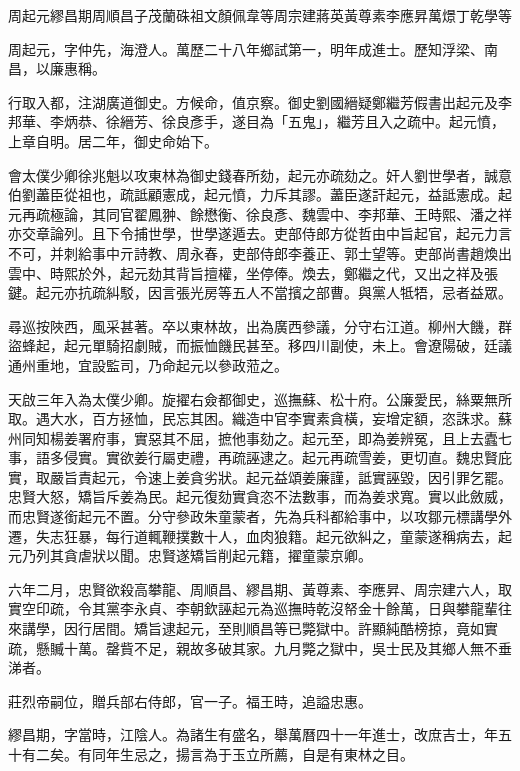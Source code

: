 
\begin{pinyinscope}
周起元繆昌期周順昌子茂蘭硃祖文顏佩韋等周宗建蔣英黃尊素李應昇萬燝丁乾學等

周起元，字仲先，海澄人。萬歷二十八年鄉試第一，明年成進士。歷知浮梁、南昌，以廉惠稱。

行取入都，注湖廣道御史。方候命，值京察。御史劉國縉疑鄭繼芳假書出起元及李邦華、李炳恭、徐縉芳、徐良彥手，遂目為「五鬼」，繼芳且入之疏中。起元憤，上章自明。居二年，御史命始下。

會太僕少卿徐兆魁以攻東林為御史錢春所劾，起元亦疏劾之。奸人劉世學者，誠意伯劉藎臣從祖也，疏詆顧憲成，起元憤，力斥其謬。藎臣遂訐起元，益詆憲成。起元再疏極論，其同官翟鳳翀、餘懋衡、徐良彥、魏雲中、李邦華、王時熙、潘之祥亦交章論列。且下令捕世學，世學遂遁去。吏部侍郎方從哲由中旨起官，起元力言不可，并刺給事中亓詩教、周永春，吏部侍郎李養正、郭士望等。吏部尚書趙煥出雲中、時熙於外，起元劾其背旨擅權，坐停俸。煥去，鄭繼之代，又出之祥及張鍵。起元亦抗疏糾駁，因言張光房等五人不當擯之部曹。與黨人牴牾，忌者益眾。

尋巡按陜西，風采甚著。卒以東林故，出為廣西參議，分守右江道。柳州大饑，群盜蜂起，起元單騎招劇賊，而振恤饑民甚至。移四川副使，未上。會遼陽破，廷議通州重地，宜設監司，乃命起元以參政蒞之。

天啟三年入為太僕少卿。旋擢右僉都御史，巡撫蘇、松十府。公廉愛民，絲粟無所取。遇大水，百方拯恤，民忘其困。織造中官李實素貪橫，妄增定額，恣誅求。蘇州同知楊姜署府事，實惡其不屈，摭他事劾之。起元至，即為姜辨冤，且上去蠹七事，語多侵實。實欲姜行屬吏禮，再疏誣逮之。起元再疏雪姜，更切直。魏忠賢庇實，取嚴旨責起元，令速上姜貪劣狀。起元益頌姜廉謹，詆實誣毀，因引罪乞罷。忠賢大怒，矯旨斥姜為民。起元復劾實貪恣不法數事，而為姜求寬。實以此斂威，而忠賢遂銜起元不置。分守參政朱童蒙者，先為兵科都給事中，以攻鄒元標講學外遷，失志狂暴，每行道輒鞭撲數十人，血肉狼籍。起元欲糾之，童蒙遂稱病去，起元乃列其貪虐狀以聞。忠賢遂矯旨削起元籍，擢童蒙京卿。

六年二月，忠賢欲殺高攀龍、周順昌、繆昌期、黃尊素、李應昇、周宗建六人，取實空印疏，令其黨李永貞、李朝欽誣起元為巡撫時乾沒帑金十餘萬，日與攀龍輩往來講學，因行居間。矯旨逮起元，至則順昌等已斃獄中。許顯純酷榜掠，竟如實疏，懸贓十萬。罄貲不足，親故多破其家。九月斃之獄中，吳士民及其鄉人無不垂涕者。

莊烈帝嗣位，贈兵部右侍郎，官一子。福王時，追謚忠惠。

繆昌期，字當時，江陰人。為諸生有盛名，舉萬曆四十一年進士，改庶吉士，年五十有二矣。有同年生忌之，揚言為于玉立所薦，自是有東林之目。


\end{pinyinscope}
